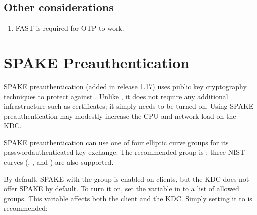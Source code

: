 \documentclass[letterpaper,10pt,english]{sphinxmanual}
\begin{document}
\section{Other considerations}
\label{\detokenize{admin/otp:other-considerations}}\begin{enumerate}
%
\item {} 
\sphinxAtStartPar
FAST is required for OTP to work.

\end{enumerate}

\sphinxstepscope


\chapter{SPAKE Preauthentication}
\label{\detokenize{admin/spake:spake-preauthentication}}\label{\detokenize{admin/spake:spake}}\label{\detokenize{admin/spake::doc}}
\sphinxAtStartPar
SPAKE preauthentication (added in release 1.17) uses public key
cryptography techniques to protect against {\hyperref[\detokenize{admin/dictionary:dictionary}]{}}.  Unlike {\hyperref[\detokenize{admin/pkinit:pkinit}]{}}, it does not
require any additional infrastructure such as certificates; it simply
needs to be turned on.  Using SPAKE preauthentication may modestly
increase the CPU and network load on the KDC.

\sphinxAtStartPar
SPAKE preauthentication can use one of four elliptic curve groups for
its password\sphinxhyphen{}authenticated key exchange.  The recommended group is
; three NIST curves (, , and
) are also supported.

\sphinxAtStartPar
By default, SPAKE with the  group is enabled on
clients, but the KDC does not offer SPAKE by default.  To turn it on,
set the  variable in {\hyperref[\detokenize{admin/conf_files/krb5_conf:libdefaults}]{}} to a
list of allowed groups.  This variable affects both the client and the
KDC.  Simply setting it to  is recommended:

\begin{sphinxVerbatim}[commandchars=\\\{\}]
\PYG{p}{[}\PYG{p}{]}
      
\end{sphinxVerbatim}
\end{document}
